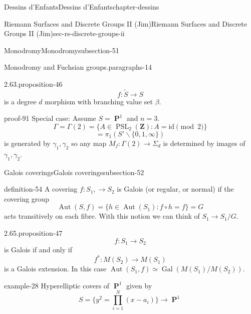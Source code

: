 \documentclass[oneside,10pt,]{book}
\numberwithin{equation}{section}
\newcommand{\ZZ}{\mathbf{Z}}
\newcommand{\id}{\mathrm{id}}
\newcommand{\Gal}[2]{\operatorname{Gal}(#1/#2)}
\DeclareMathOperator{\PP}{\mathbf{P}}
\DeclareMathOperator{\Aut}{Aut}
\DeclareMathOperator{\PSL}{PSL}
\begin{document}
\begin{chapterptx}{Dessins d'Enfants}{}{Dessins d'Enfants}{}{}{chapter-dessins}
\begin{sectionptx}{Riemann Surfaces and Discrete Groups II (Jim)}{}{Riemann Surfaces and Discrete Groups II (Jim)}{}{}{sec-rs-discrete-groups-ii}
\begin{subsectionptx}{Monodromy}{}{Monodromy}{}{}{subsection-51}
\begin{paragraphs}{Monodromy and Fuchsian groups.}{paragraphs-14}
\begin{proposition}{2.63.}{}{proposition-46}
\begin{equation*}
f\colon \tilde S \to S
\end{equation*}
is a degree \(d\) morphism with branching  value set \(\beta\).%
\end{proposition}
\begin{proofptx}{}{proof-91}
\hypertarget{p-584}{}%
Special case: Assume \(S = \PP^1\) and \(n=3\).%
\begin{equation*}
\Gamma = \Gamma(2) = \{ A \in \PSL_2(\ZZ) : A = \id \pmod 2\}
\end{equation*}
%
\begin{equation*}
= \pi_1 (S' \smallsetminus \{0,1,\infty\})
\end{equation*}
is generated by \(\gamma_1, \gamma_2\) so any map \(M_f \colon \Gamma(2) \to \Sigma_d\) is determined by  images of \(\gamma_1, \gamma_2\).%
\end{proofptx}
\end{paragraphs}%
\end{subsectionptx}
%
%
\typeout{************************************************}
\typeout{************************************************}
%
\begin{subsectionptx}{Galois coverings}{}{Galois coverings}{}{}{subsection-52}
\begin{definition}{}{definition-54}%
\hypertarget{p-585}{}%
A covering \(f\colon S_1,\to S_2\) is Galois (or regular, or normal) if the covering group%
\begin{equation*}
\Aut(S,f) =  \{ h\in \Aut(S_1) : f\circ h= f\} = G
\end{equation*}
acts transitively on each fibre. With this notion we can think of \(S_1 \to S_1/G\).%
\end{definition}
\begin{proposition}{2.65.}{}{proposition-47}%
\hypertarget{p-586}{}%
%
\begin{equation*}
f\colon S_1 \to S_2
\end{equation*}
is Galois if and only if%
\begin{equation*}
f^* \colon M(S_2 ) \to M(S_1)
\end{equation*}
is a Galois extension. In this case \(\Aut(S_1, f)  \simeq \Gal{M(S_1)}{M(S_2)}\).%
\end{proposition}
\begin{example}{}{example-28}%
\hypertarget{p-587}{}%
Hyperelliptic covers of \(\PP^1\) given by%
\begin{equation*}
S = \{ y^2 = \prod_{i=1}^N (x- a_i)\} \to \PP^1

\end{equation*}
\end{example}
\end{subsectionptx}
\end{sectionptx}
\end{chapterptx}
\end{document}
